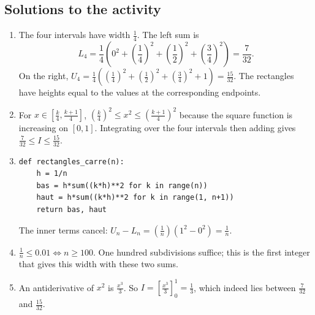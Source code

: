 \subsection{Solutions to the activity}\begin{enumerate}
\item The four intervals have width $\frac{1}{4}$. The left sum is
\[L_4=\frac{1}{4}(0^2+(\frac{1}{4})^2+(\frac{1}{2})^2+(\frac{3}{4})^2)=\frac{7}{32}.\]
On the right, $U_4=\frac{1}{4}((\frac{1}{4})^2+(\frac{1}{2})^2+(\frac{3}{4})^2+1)=\frac{15}{32}$. The rectangles have heights equal to the values at the corresponding endpoints.
\item For $x\in[\frac{k}{4},\frac{k+1}{4}]$, $(\frac{k}{4})^2\le x^2\le(\frac{k+1}{4})^2$ because the square function is increasing on $[0,1]$. Integrating over the four intervals then adding gives $\frac{7}{32}\le I\le\frac{15}{32}$.
\item 
\begin{lstlisting}
def rectangles_carre(n):
    h = 1/n
    bas = h*sum((k*h)**2 for k in range(n))
    haut = h*sum((k*h)**2 for k in range(1, n+1))
    return bas, haut
\end{lstlisting}
The inner terms cancel: $U_n-L_n=(\frac{1}{n})(1^2-0^2)=\frac{1}{n}$.
\item $\frac{1}{n}\le\num{0,01}\Longleftrightarrow n\ge100$. One hundred subdivisions suffice; this is the first integer that gives this width with these two sums.
\item An antiderivative of $x^2$ is $\frac{x^3}{3}$. So $I=[\frac{x^3}{3}]_0^1=\frac{1}{3}$, which indeed lies between $\frac{7}{32}$ and $\frac{15}{32}$.
\end{enumerate}

